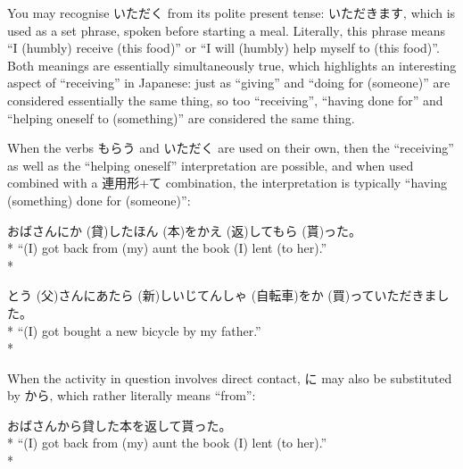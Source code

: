 \documentclass[11pt, b5paper, twoside, openright, onecolumn]{book}
\makeatletter
\newcommand*{\rubystack}[2]{{\relscale{0.5}%
  \begin{tabular}[b]{@{}c@{}}%
    {#1}\\%
   {\textscale{2}{#2}}%
  \end{tabular}}%
}
\DeclareRobustCommand*{\ruby}[2]{%
  \mbox{%
    \setlength{\parskip}{0ex}%
    \BeginAccSupp{method=pdfstringdef,ActualText={#1}}%
      \rubystack{\phantom{#2}}{#1}%
      \llap{%
        \rubystack{#2}{\phantom{#1}}%
      }%
    \EndAccSupp{}%
  }%
}
\renewcommand*{\ruby}[2]{#2 (#1)}%
\newenvironment{exampleblock}{
\setlength{\parindent}{0.6in}
\begin{minipage}[t]{\dimexpr\textwidth-\parindent}}
{\end{minipage}}
\makeatother
\begin{document}
You may recognise いただく from its polite present tense: いただきます‚ which is used as a set phrase‚ spoken before starting a meal. Literally‚ this phrase means “I (humbly) receive (this food)” or “I will (humbly) help myself to (this food)”. Both meanings are essentially simultaneously true‚ which highlights an interesting aspect of “receiving” in Japanese: just as “giving” and “doing for (someone)” are considered essentially the same thing‚ so too “receiving”‚ “having done for” and “helping oneself to (something)” are considered the same thing.

When the verbs もらう and いただく are used on their own‚ then the “receiving” as well as the “helping oneself” interpretation are possible‚ and when used combined with a 連用形+て combination‚ the interpretation is typically “having (something) done for (someone)”:

\vspace{0.4cm}
\begin{exampleblock}
おばさんに\ruby{貸}{か}した\ruby{本}{ほん}を\ruby{返}{かえ}して\ruby{貰}{もら}った。 \\* 
“(I) got back from (my) aunt the book (I) lent (to her).” \\* 
\end{exampleblock}
\vspace{0.2cm}

\begin{exampleblock}
\ruby{父}{とう}さんに\ruby{新}{あたら}しい\ruby{自転車}{じてんしゃ}を\ruby{買}{か}っていただきました。 \\* 
“(I) got bought a new bicycle by my father.” \\* 
\end{exampleblock}
\vspace{0.2cm}

When the activity in question involves direct contact‚ に may also be substituted by から‚ which rather literally means “from”:

\vspace{0.4cm}
\begin{exampleblock}
おばさんから貸した本を返して貰った。 \\* 
“(I) got back from (my) aunt the book (I) lent (to her).” \\* 
\end{exampleblock}
\vspace{0.2cm}
\end{document}
